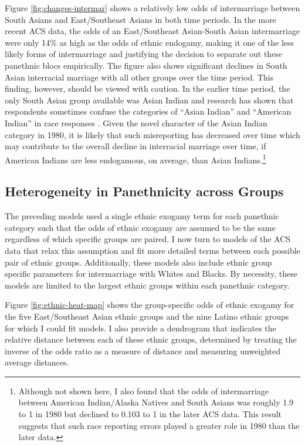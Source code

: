 \documentclass[11pt,]{article}
\begin{document}
Figure \ref{fig:changes-intermar} shows a relatively low odds of intermarriage between South Asians and East/Southeast Asians in both time periods. In the more recent ACS data, the odds of an East/Southeast Asian-South Asian intermarriage were only 14\% as high as the odds of ethnic endogamy, making it one of the less likely forms of intermarriage and justifying the decision to separate out these panethnic blocs empirically. The figure also shows significant declines in South Asian interracial marriage with all other groups over the time period. This finding, however, should be viewed with caution. In the earlier time period, the only South Asian group available was Asian Indian and research has shown that respondents sometimes confuse the categories of ``Asian Indian'' and ``American Indian'' in race responses \citep{liebler_american_2004}. Given the novel character of the Asian Indian category in 1980, it is likely that such misreporting has decreased over time which may contribute to the overall decline in interracial marriage over time, if American Indians are less endogamous, on average, than Asian Indians.\footnote{Although not shown here, I also found that the odds of intermarriage between American Indian/Alaska Natives and South Asians was roughly 1.9 to 1 in 1980 but declined to 0.103 to 1 in the later ACS data. This result suggests that such race reporting errors played a greater role in 1980 than the later data.}

\hypertarget{heterogeneity-in-panethnicity-across-groups}{%
\subsection{Heterogeneity in Panethnicity across Groups}\label{heterogeneity-in-panethnicity-across-groups}}

The preceding models used a single ethnic exogamy term for each panethnic category such that the odds of ethnic exogamy are assumed to be the same regardless of which specific groups are paired. I now turn to models of the ACS data that relax this assumption and fit more detailed terms between each possible pair of ethnic groups. Additionally, these models also include ethnic group specific parameters for intermarriage with Whites and Blacks. By necessity, these models are limited to the largest ethnic groups within each panethnic category.

Figure \ref{fig:ethnic-heat-map} shows the group-specific odds of ethnic exogamy for the five East/Southeast Asian ethnic groups and the nine Latino ethnic groups for which I could fit models. I also provide a dendrogram that indicates the relative distance between each of these ethnic groups, determined by treating the inverse of the odds ratio as a measure of distance and measuring unweighted average distances.
\end{document}
